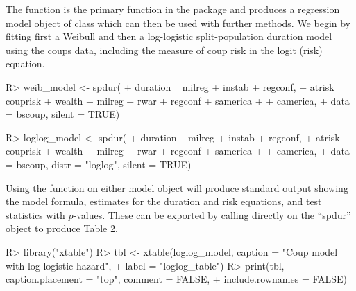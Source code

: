 \documentclass[article]{jss}
\begin{document}
The  function is the primary function in the package and
produces a regression model object of class  which can then
be used with further methods. We begin by fitting first a Weibull and
then a log-logistic split-population duration model using the coups
data, including the measure of coup risk in the logit (risk) equation.

\begin{CodeChunk}
\begin{CodeInput}
R> weib_model <- spdur(
+    duration ~ milreg + instab + regconf,
+    atrisk ~ couprisk + wealth + milreg + rwar + regconf + samerica + 
+      camerica,
+    data = bscoup, silent = TRUE)

R> loglog_model <- spdur(
+    duration ~ milreg + instab + regconf,
+    atrisk ~ couprisk + wealth + milreg + rwar + regconf + samerica + 
+      camerica,
+    data = bscoup, distr = "loglog", silent = TRUE)
\end{CodeInput}
\end{CodeChunk}

Using the  function on either model object will produce
standard output showing the model formula, estimates for the duration
and risk equations, and test statistics with \(p\)-values. These can be
exported by calling  directly on the ``spdur'' object to
produce Table 2.

\begin{CodeChunk}
\begin{CodeInput}
R> library("xtable")
R> tbl <- xtable(loglog_model, caption = "Coup model with log-logistic hazard",
+    label = "loglog_table")
R> print(tbl, caption.placement = "top", comment = FALSE, 
+    include.rownames = FALSE)
\end{CodeInput}
\end{CodeChunk}
\end{document}

